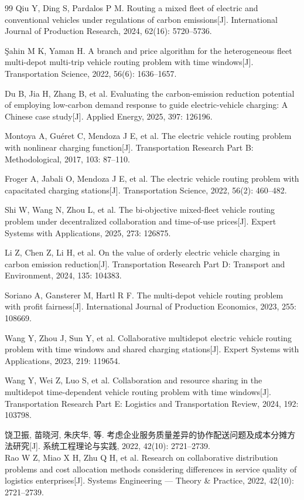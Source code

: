 \documentclass{setp-new}
\begin{document}
\begin{thebibliography}{99}
 Qiu Y, Ding S, Pardalos P M. Routing a mixed fleet of electric and conventional vehicles under regulations of carbon emissions[J]. International Journal of Production Research, 2024, 62(16): 5720--5736.

 Şahin M K, Yaman H. A branch and price algorithm for the heterogeneous fleet multi-depot multi-trip vehicle routing problem with time windows[J]. Transportation Science, 2022, 56(6): 1636--1657.

 Du B, Jia H, Zhang B, et al. Evaluating the carbon-emission reduction potential of employing low-carbon demand response to guide electric-vehicle charging: A Chinese case study[J]. Applied Energy, 2025, 397: 126196.

 Montoya A, Guéret C, Mendoza J E, et al. The electric vehicle routing problem with nonlinear charging function[J]. Transportation Research Part B: Methodological, 2017, 103: 87--110.

 Froger A, Jabali O, Mendoza J E, et al. The electric vehicle routing problem with capacitated charging stations[J]. Transportation Science, 2022, 56(2): 460--482.

 Shi W, Wang N, Zhou L, et al. The bi-objective mixed-fleet vehicle routing problem under decentralized collaboration and time-of-use prices[J]. Expert Systems with Applications, 2025, 273: 126875.

 Li Z, Chen Z, Li H, et al. On the value of orderly electric vehicle charging in carbon emission reduction[J]. Transportation Research Part D: Transport and Environment, 2024, 135: 104383.

 Soriano A, Gansterer M, Hartl R F. The multi-depot vehicle routing problem with profit fairness[J]. International Journal of Production Economics, 2023, 255: 108669.

 Wang Y, Zhou J, Sun Y, et al. Collaborative multidepot electric vehicle routing problem with time windows and shared charging stations[J]. Expert Systems with Applications, 2023, 219: 119654.

 Wang Y, Wei Z, Luo S, et al. Collaboration and resource sharing in the multidepot time-dependent vehicle routing problem with time windows[J]. Transportation Research Part E: Logistics and Transportation Review, 2024, 192: 103798.

 饶卫振, 苗晓河, 朱庆华, 等. 考虑企业服务质量差异的协作配送问题及成本分摊方法研究[J]. 系统工程理论与实践, 2022, 42(10): 2721--2739.\\
Rao W Z, Miao X H, Zhu Q H, et al. Research on collaborative distribution problems and cost allocation methods considering differences in service quality of logistics enterprises[J]. Systems Engineering --- Theory \& Practice, 2022, 42(10): 2721--2739.


\end{thebibliography}
\end{document}
